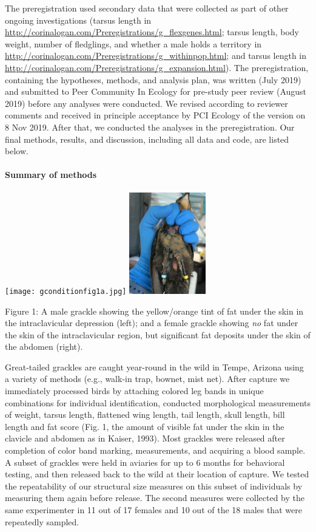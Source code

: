\documentclass[
]{article}
\begin{document}
The preregistration used secondary data that were collected as part of
other ongoing investigations (tarsus length in
\url{http://corinalogan.com/Preregistrations/g_flexgenes.html}; tarsus
length, body weight, number of fledglings, and whether a male holds a
territory in
\url{http://corinalogan.com/Preregistrations/g_withinpop.html}; and
tarsus length in
\url{http://corinalogan.com/Preregistrations/g_expansion.html}). The
preregistration, containing the hypotheses, methods, and analysis plan,
was written (July 2019) and submitted to Peer Community In Ecology for
pre-study peer review (August 2019) before any analyses were conducted.
We revised according to reviewer comments and received in principle
acceptance by PCI Ecology of the version on 8 Nov 2019. After that, we
conducted the analyses in the preregistration. Our final methods,
results, and discussion, including all data and code, are listed below.

\hypertarget{summary-of-methods}{%
\paragraph{\texorpdfstring{\textbf{Summary of
methods}}{Summary of methods}}\label{summary-of-methods}}

\texttt{[image: gconditionfig1a.jpg]}
\includegraphics[width=0.25\textwidth,height=\textheight]{gconditionfig1b.jpg}

Figure 1: A male grackle showing the yellow/orange tint of fat under the
skin in the intraclavicular depression (left); and a female grackle
showing \emph{no} fat under the skin of the intraclavicular region, but
significant fat deposits under the skin of the abdomen (right).

Great-tailed grackles are caught year-round in the wild in Tempe,
Arizona using a variety of methods (e.g., walk-in trap, bownet, mist
net). After capture we immediately processed birds by attaching colored
leg bands in unique combinations for individual identification,
conducted morphological measurements of weight, tarsus length, flattened
wing length, tail length, skull length, bill length and fat score (Fig.
1, the amount of visible fat under the skin in the clavicle and abdomen
as in Kaiser, 1993). Most grackles were released after completion of
color band marking, measurements, and acquiring a blood sample. A subset
of grackles were held in aviaries for up to 6 months for behavioral
testing, and then released back to the wild at their location of
capture. We tested the repeatability of our structural size measures on
this subset of individuals by measuring them again before release. The
second measures were collected by the same experimenter in 11 out of 17
females and 10 out of the 18 males that were repeatedly sampled.
\end{document}

